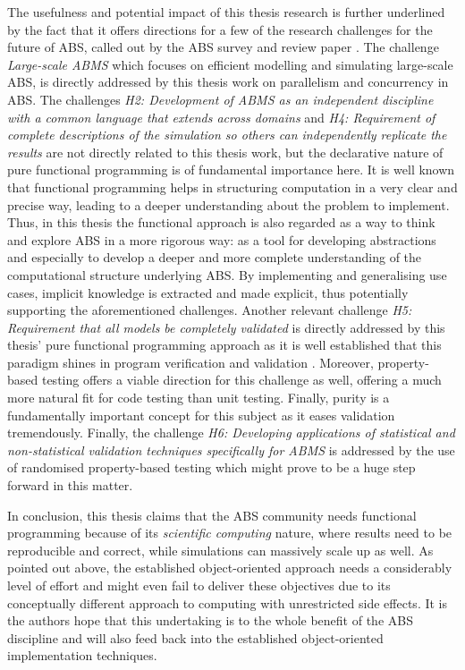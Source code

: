 The usefulness and potential impact of this thesis research is further underlined by the fact that it offers directions for a few of the research challenges for the future of ABS, called out by the ABS survey and review paper \cite{macal_everything_2016}. The challenge \textit{Large-scale ABMS} which focuses on efficient modelling and simulating large-scale ABS, is directly addressed by this thesis work on parallelism and concurrency in ABS. The challenges \emph{H2: Development of ABMS as an independent discipline with a common language that extends across domains} and \emph{H4: Requirement of complete descriptions of the simulation so others can independently replicate the results} are not directly related to this thesis work, but the declarative nature of pure functional programming is of fundamental importance here. It is well known that functional programming helps in structuring computation in a very clear and precise way, leading to a deeper understanding about the problem to implement. Thus, in this thesis the functional approach is also regarded as a way to think and explore ABS in a more rigorous way: as a tool for developing abstractions and especially to develop a deeper and more complete understanding of the computational structure underlying ABS. By implementing and generalising use cases, implicit knowledge is extracted and made explicit, thus potentially supporting the aforementioned challenges. Another relevant challenge \emph{H5: Requirement that all models be completely validated} is directly addressed by this thesis' pure functional programming approach as it is well established that this paradigm shines in program verification and validation \cite{hudak_history_2007, hutton_tutorial_1999}. Moreover, property-based testing offers a viable direction for this challenge as well, offering a much more natural fit for code testing than unit testing. Finally, purity is a fundamentally important concept for this subject as it eases validation tremendously. Finally, the challenge \emph{H6: Developing applications of statistical and non-statistical validation techniques specifically for ABMS} is addressed by the use of randomised property-based testing which might prove to be a huge step forward in this matter.

\medskip

In conclusion, this thesis claims that the ABS community needs functional programming because of its \textit{scientific computing} nature, where results need to be reproducible and correct, while simulations can massively scale up as well. As pointed out above, the established object-oriented approach needs a considerably level of effort and might even fail to deliver these objectives due to its conceptually different approach to computing with unrestricted side effects. It is the authors hope that this undertaking is to the whole benefit of the ABS discipline and will also feed back into the established object-oriented implementation techniques.

